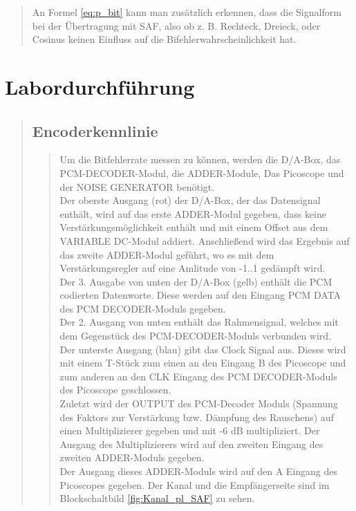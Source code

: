 \begin{quote}
	An Formel \ref{eq:p_bit} kann man zusätzlich erkennen, dass die Signalform bei der Übertragung mit SAF, also ob z. B.
	Rechteck, Dreieck, oder Cosinus keinen Einfluss auf die Bifehlerwahrscheinlichkeit hat.
    
    
\end{quote}


\section{Labordurchführung}
\begin{quote}
    
    
    \subsection{Encoderkennlinie}
    \begin{quote}
        
        Um die Bitfehlerrate messen zu können, werden die D/A-Box, das PCM-DECODER-Modul, die ADDER-Module, Das Picoscope
       und der NOISE GENERATOR benötigt.\\
       Der oberste Ausgang (rot) der D/A-Box, der das Datensignal enthält, wird auf das erste ADDER-Modul gegeben, dass
       keine Verstärkungsmöglichkeit enthält und mit einem Offset aus dem VARIABLE DC-Modul addiert. Anschließend wird
       das Ergebnis auf das zweite ADDER-Modul geführt, wo es mit dem Verstärkungsregler auf eine Amlitude von -1..1
       gedämpft wird.\\
       Der 3. Ausgabe von unten der D/A-Box (gelb) enthält die PCM codierten Datenworte. Diese werden auf den Eingang
       PCM DATA des PCM DECODER-Moduls gegeben.\\
       Der 2. Ausgang von unten enthält das Rahmensignal, welches mit dem Gegenstück des PCM-DECODER-Moduls verbunden
       wird.\\
       Der unterste Ausgang (blau) gibt das Clock Signal aus. Dieses wird mit einem T-Stück zum einen an den Eingang B
       des Picoscope und zum anderen an den CLK Eingang des PCM DECODER-Moduls des Picoscope geschlossen.\\
       Zuletzt wird der OUTPUT des PCM-Decoder Moduls (Spannung des Faktors zur Verstärkung bzw. Dämpfung des
       Rauschens) auf einen Multiplizierer gegeben und mit -6 dB multipliziert. Der Ausgang des Multiplizierers wird auf den
       zweiten Eingang des zweiten ADDER-Moduls gegeben.\\
       Der Ausgang dieses ADDER-Moduls wird auf den A Eingang des Picoscopes gegeben.
       Der Kanal und die Empfängerseite sind im Blockschaltbild \ref{fig:Kanal_pl_SAF} zu sehen.
       

\end{quote}
\end{quote}
